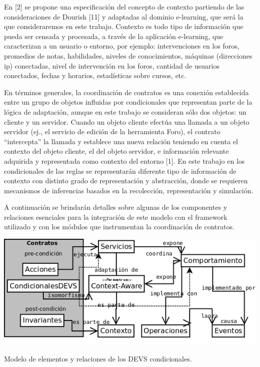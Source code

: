 En [2] se propone una especificación del concepto de contexto partiendo de las
consideraciones de Dourish [11] y adaptadas al dominio e-learning, que será la
que consideraremos en este trabajo. Contexto es todo tipo de información que
pueda ser censada y procesada, a través de la aplicación e-learning, que
caracterizan a un usuario o entorno, por ejemplo: intervenciones en los foros,
promedios de notas, habilidades, niveles de conocimientos, máquinas (direcciones
ip) conectadas, nivel de intervención en los foros, cantidad de usuarios
conectados, fechas y horarios, estadísticas sobre cursos, etc.

En términos generales, la coordinación de contratos es una conexión establecida
entre un grupo de objetos influidas por condicionales que representan parte de
la lógica de adaptación, aunque en este trabajo se consideran sólo dos objetos:
un cliente y un servidor. Cuando un objeto cliente efectúa una llamada a un
objeto servidor (ej., el servicio de edición de la herramienta Foro), el
contrato “intercepta” la llamada y establece una nueva relación teniendo en
cuenta el contexto del objeto cliente, el del objeto servidor, e información
relevante adquirida y representada como contexto del entorno [1]. En este
trabajo en los condicionales de las reglas se representarán diferente tipo de
información de contexto con distinto grado de representación y abstracción,
donde se requieren mecanismos de inferencias basados en la recolección,
representación y simulación.

A continuación se brindarán detalles sobre algunas de los componentes y
relaciones esenciales para la integración de este modelo con el framework
utilizado y con los módulos que instrumentan la coordinación de contratos.


\begin{center}
 \includegraphics[width=5 in,totalheight=4 in] {Ch9/f1}
\end{center}
\caption{Modelo de elementos y relaciones de los DEVS condicionales.}


